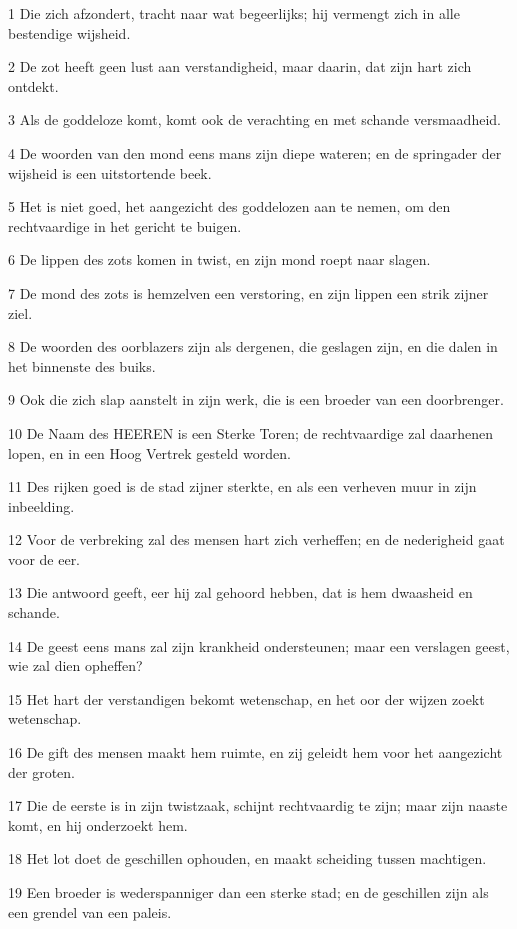 \par 1 Die zich afzondert, tracht naar wat begeerlijks; hij vermengt zich in alle bestendige wijsheid.
\par 2 De zot heeft geen lust aan verstandigheid, maar daarin, dat zijn hart zich ontdekt.
\par 3 Als de goddeloze komt, komt ook de verachting en met schande versmaadheid.
\par 4 De woorden van den mond eens mans zijn diepe wateren; en de springader der wijsheid is een uitstortende beek.
\par 5 Het is niet goed, het aangezicht des goddelozen aan te nemen, om den rechtvaardige in het gericht te buigen.
\par 6 De lippen des zots komen in twist, en zijn mond roept naar slagen.
\par 7 De mond des zots is hemzelven een verstoring, en zijn lippen een strik zijner ziel.
\par 8 De woorden des oorblazers zijn als dergenen, die geslagen zijn, en die dalen in het binnenste des buiks.
\par 9 Ook die zich slap aanstelt in zijn werk, die is een broeder van een doorbrenger.
\par 10 De Naam des HEEREN is een Sterke Toren; de rechtvaardige zal daarhenen lopen, en in een Hoog Vertrek gesteld worden.
\par 11 Des rijken goed is de stad zijner sterkte, en als een verheven muur in zijn inbeelding.
\par 12 Voor de verbreking zal des mensen hart zich verheffen; en de nederigheid gaat voor de eer.
\par 13 Die antwoord geeft, eer hij zal gehoord hebben, dat is hem dwaasheid en schande.
\par 14 De geest eens mans zal zijn krankheid ondersteunen; maar een verslagen geest, wie zal dien opheffen?
\par 15 Het hart der verstandigen bekomt wetenschap, en het oor der wijzen zoekt wetenschap.
\par 16 De gift des mensen maakt hem ruimte, en zij geleidt hem voor het aangezicht der groten.
\par 17 Die de eerste is in zijn twistzaak, schijnt rechtvaardig te zijn; maar zijn naaste komt, en hij onderzoekt hem.
\par 18 Het lot doet de geschillen ophouden, en maakt scheiding tussen machtigen.
\par 19 Een broeder is wederspanniger dan een sterke stad; en de geschillen zijn als een grendel van een paleis.
